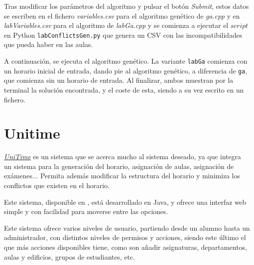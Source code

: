 Tras modificar los parámetros del algoritmo y pulsar el botón \textit{Submit}, estos datos se escriben en el fichero \textit{variables.csv} para el algoritmo genético de \textit{ga.cpp} y en \textit{labVariables.csv} para el algoritmo de \textit{labGa.cpp} y se comienza a ejecutar el $script$ en Python \texttt{labConflictsGen.py} que genera un CSV con las incompatibilidades que pueda haber en las aulas.

A continuación, se ejecuta el algoritmo genético. La variante \texttt{labGa} comienza con un horario inicial de entrada, dando pie al algoritmo genético, a diferencia de \texttt{ga}, que comienza sin un horario de entrada. Al finalizar, ambos muestran por la terminal la solución encontrada, y el coste de esta, siendo a su vez escrito en un fichero.

\section{Unitime}

\href{https://github.com/UniTime/unitime}{\textit{UniTime}} es un sistema que se acerca mucho al sistema deseado, ya que integra un sistema para la generación del horario, asignación de aulas, asignación de exámenes$\ldots$ Permita además modificar la estructura del horario y minimiza los conflictos que existen en el horario.

Este sistema, disponible en \cite{unitime}, está desarrollado en Java, y ofrece una interfaz web simple y con facilidad para moverse entre las opciones.

Este sistema ofrece varios niveles de usuario, partiendo desde un alumno hasta un administrador, con distintos niveles de permisos y acciones, siendo este último el que más acciones disponibles tiene, como son añadir asignaturas, departamentos, aulas y edificios, grupos de estudiantes, etc. 
